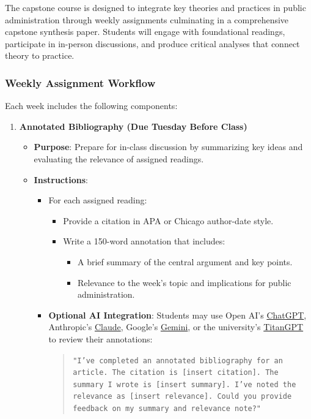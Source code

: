 \documentclass[12pt, letterpaper]{article}
\begin{document}
The capstone course is designed to integrate key theories and practices in public administration through weekly assignments culminating in a comprehensive capstone synthesis paper. Students will engage with foundational readings, participate in in-person discussions, and produce critical analyses that connect theory to practice.

\subsubsection*{Weekly Assignment Workflow}

Each week includes the following components:

\begin{enumerate}
    \item \textbf{Annotated Bibliography (Due Tuesday Before Class)}
    \begin{itemize}
        \item \textbf{Purpose}: Prepare for in-class discussion by summarizing key ideas and evaluating the relevance of assigned readings.
        \item \textbf{Instructions}:
        \begin{itemize}
            \item For each assigned reading:
            \begin{itemize}
                \item Provide a citation in APA or Chicago author-date style.
                \item Write a 150-word annotation that includes:
                \begin{itemize}
                    \item A brief summary of the central argument and key points.
                    \item Relevance to the week’s topic and implications for public administration.
                \end{itemize}
            \end{itemize}
            \item \textbf{Optional AI Integration}: Students may use Open AI's \href{https://chat.openai.com/}{ChatGPT}, Anthropic's \href{https://www.anthropic.com/}{Claude}, Google's \href{https://www.google.com/search/about/}{Gemini}, or the university's \href{https://titangpt.fullerton.edu/auth/jwt/login}{TitanGPT} to review their annotations:
            \begin{quote}
                \texttt{"I've completed an annotated bibliography for an article. The citation is [insert citation]. The summary I wrote is [insert summary]. I've noted the relevance as [insert relevance]. Could you provide feedback on my summary and relevance note?"}


\end{quote}
\end{itemize}
\end{itemize}
\end{enumerate}
\end{document}

